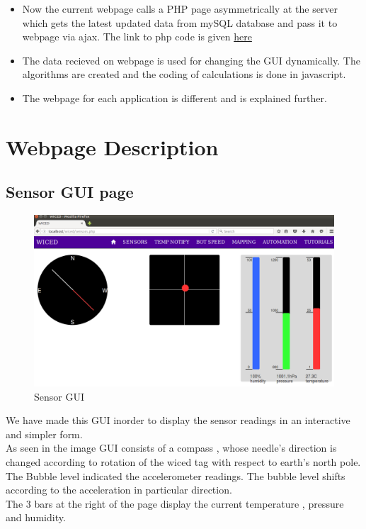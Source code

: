 \documentclass[a4paper,12pt,oneside]{book}
\begin{document}
\begin{itemize}
  \item Now the current webpage calls a PHP page asymmetrically at the server which gets the latest updated data from mySQL database and pass it to webpage via ajax. The link to php code is given \href{https://github.com/eYSIP-2016/Wiced-Sense/blob/master/Codes/wiced%20web/controller/new.php}{here}
  
  \item The data recieved on webpage is used for changing the GUI dynamically. The algorithms are created and the coding of calculations is done in javascript.
  
  \item The webpage for each application is different and is explained further.
\end{itemize}







\newpage
\section{Webpage Description}

\subsection{Sensor GUI page}

\begin{figure}[h]
        \centering
    	\includegraphics[scale=0.2]{sensor.png}
    	\caption{Sensor GUI}
	    \end{figure}
	    
	    \hspace{5mm}We have made this GUI inorder to display the sensor readings in an interactive and simpler form.\\ As seen in the image GUI consists of a compass , whose needle's direction is changed according to rotation of the wiced tag with respect to earth's north pole.
        \\The Bubble level indicated the accelerometer readings. The bubble level shifts according to the acceleration in particular direction.
        \\The 3 bars at the right of the page display the current temperature , pressure and humidity.\\
\end{document}
